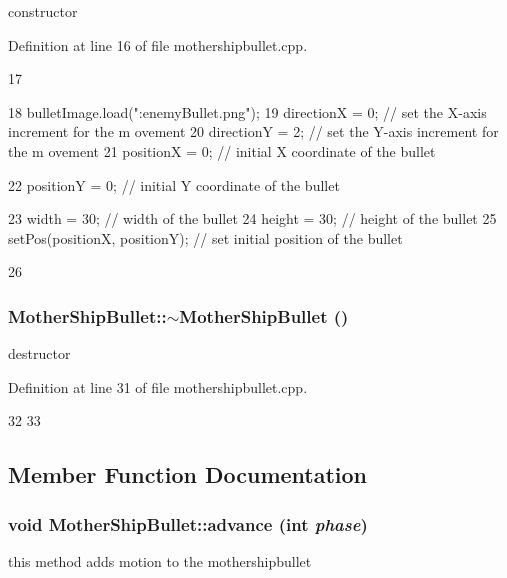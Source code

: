 constructor 

Definition at line 16 of file mothershipbullet.cpp.


\begin{DoxyCode}
17 {
18     bulletImage.load(":enemyBullet.png");
19     directionX = 0;                         // set the X-axis increment for the m
      ovement
20     directionY = 2;                         // set the Y-axis increment for the m
      ovement
21     positionX = 0;                          // initial X coordinate of the bullet
      
22     positionY = 0;                          // initial Y coordinate of the bullet
      
23     width = 30;                             // width of the bullet
24     height = 30;                            // height of the bullet
25     setPos(positionX, positionY);           // set initial position of the bullet
      
26 }
\end{DoxyCode}
\hypertarget{class_mother_ship_bullet_a9753e8ee030255e1edd263e00fc890e5}{
\subsubsection[{$\sim$MotherShipBullet}]{\setlength{\rightskip}{0pt plus 5cm}MotherShipBullet::$\sim$MotherShipBullet ()}}
\label{class_mother_ship_bullet_a9753e8ee030255e1edd263e00fc890e5}
destructor 

Definition at line 31 of file mothershipbullet.cpp.


\begin{DoxyCode}
32 {
33 }
\end{DoxyCode}


\subsection{Member Function Documentation}
\hypertarget{class_mother_ship_bullet_a56d988809fe0613e31c09bfb73d3ba0e}{
\subsubsection[{advance}]{\setlength{\rightskip}{0pt plus 5cm}void MotherShipBullet::advance (int {\em phase})}}
\label{class_mother_ship_bullet_a56d988809fe0613e31c09bfb73d3ba0e}
this method adds motion to the mothershipbullet 


